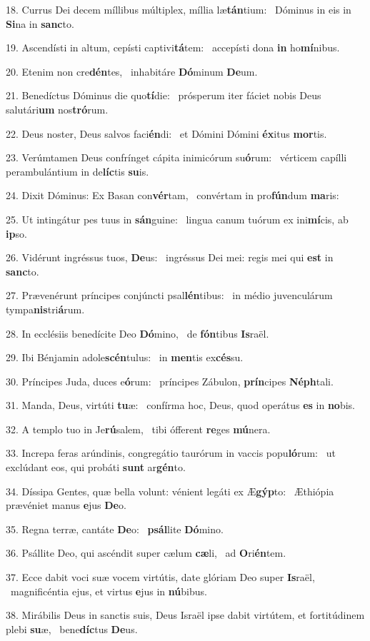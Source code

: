 18. Currus Dei decem míllibus múltiplex, míllia læ\textbf{tán}tium: \ast\  Dóminus in eis in \textbf{Si}na in \textbf{sanc}to.\

19. Ascendísti in altum, cepísti captivi\textbf{tá}tem: \ast\  accepísti dona \textbf{in} ho\textbf{mí}nibus.\

20. Etenim non cre\textbf{dén}tes, \ast\  inhabitáre \textbf{Dó}minum \textbf{De}um.\

21. Benedíctus Dóminus die quo\textbf{tí}die: \ast\  prósperum iter fáciet nobis Deus salutári\textbf{um} nos\textbf{tró}rum.\

22. Deus noster, Deus salvos faci\textbf{én}di: \ast\  et Dómini Dómini \textbf{éx}itus \textbf{mor}tis.\

23. Verúmtamen Deus confrínget cápita inimicórum su\textbf{ó}rum: \ast\  vérticem capílli perambulántium in de\textbf{líc}tis \textbf{su}is.\

24. Dixit Dóminus: Ex Basan con\textbf{vér}tam, \ast\  convértam in pro\textbf{fún}dum \textbf{ma}ris:\

25. Ut intingátur pes tuus in \textbf{sán}guine: \ast\  lingua canum tuórum ex ini\textbf{mí}cis, ab \textbf{ip}so.\

26. Vidérunt ingréssus tuos, \textbf{De}us: \ast\  ingréssus Dei mei: regis mei qui \textbf{est} in \textbf{sanc}to.\

27. Prævenérunt príncipes conjúncti psal\textbf{lén}tibus: \ast\  in médio juvenculárum tympa\textbf{nis}tri\textbf{á}rum.\

28. In ecclésiis benedícite Deo \textbf{Dó}mino, \ast\  de \textbf{fón}tibus \textbf{Is}raël.\

29. Ibi Bénjamin adole\textbf{scén}tulus: \ast\  in \textbf{men}tis ex\textbf{cés}su.\

30. Príncipes Juda, duces e\textbf{ó}rum: \ast\  príncipes Zábulon, \textbf{prín}cipes \textbf{Néph}tali.\

31. Manda, Deus, virtúti \textbf{tu}æ: \ast\  confírma hoc, Deus, quod operátus \textbf{es} in \textbf{no}bis.\

32. A templo tuo in Je\textbf{rú}salem, \ast\  tibi ófferent \textbf{re}ges \textbf{mú}nera.\

33. Increpa feras arúndinis, congregátio taurórum in vaccis popu\textbf{ló}rum: \ast\  ut exclúdant eos, qui probáti \textbf{sunt} ar\textbf{gén}to.\

34. Díssipa Gentes, quæ bella volunt: vénient legáti ex Æ\textbf{gýp}to: \ast\  Æthiópia prævéniet manus \textbf{e}jus \textbf{De}o.\

35. Regna terræ, cantáte \textbf{De}o: \ast\  \textbf{psál}lite \textbf{Dó}mino.\

36. Psállite Deo, qui ascéndit super cælum \textbf{cæ}li, \ast\  ad \textbf{O}ri\textbf{én}tem.\

37. Ecce dabit voci suæ vocem virtútis, date glóriam Deo super \textbf{Is}raël, \ast\  magnificéntia ejus, et virtus \textbf{e}jus in \textbf{nú}bibus.\

38. Mirábilis Deus in sanctis suis, Deus Israël ipse dabit virtútem, et fortitúdinem plebi \textbf{su}æ, \ast\  bene\textbf{díc}tus \textbf{De}us.\

